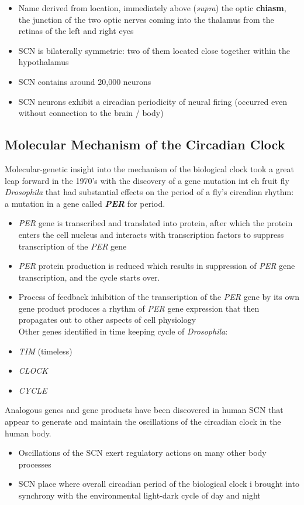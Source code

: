 \documentclass{article}
\begin{document}
\begin{itemize}
    \item Name derived from location, immediately above (\textit{supra}) the optic \textbf{chiasm}, the junction of the two optic nerves coming into the thalamus from the retinas of the left and right eyes
    \item SCN is bilaterally symmetric: two of them located close together within the hypothalamus
    \item SCN contains around 20,000 neurons
    \item SCN neurons exhibit a circadian periodicity of neural firing (occurred even without connection to the brain / body) 
\end{itemize}

\subsection{Molecular Mechanism of the Circadian Clock}
\noindent Molecular-genetic insight into the mechanism of the biological clock took a great leap forward in the 1970's with the discovery of a gene mutation int eh fruit fly  \textit{Drosophila} that had substantial effects on the period of a fly's circadian rhythm: a mutation in a gene called \textbf{\textit{PER}} for period. 
\begin{itemize}
    \item \textit{PER} gene is transcribed and translated into protein, after which the protein enters the cell nucleus and interacts with transcription factors to suppress transcription of the \textit{PER} gene
    \item \textit{PER} protein production is reduced which results in suppression of \textit{PER} gene transcription, and the cycle starts over. 
    \item Process of feedback inhibition of the transcription of the \textit{PER} gene by its own gene product produces a rhythm of \textit{PER} gene expression that then propagates out to other aspects of cell physiology \\
    
    Other genes identified in time keeping cycle of \textit{Drosophila}: 
    \item \textit{TIM} (timeless) 
    \item \textit{CLOCK}
    \item \textit{CYCLE}
\end{itemize}

Analogous genes and gene products have been discovered in human SCN that appear to generate and maintain the oscillations of the circadian clock in the human body. 
\begin{itemize}
    \item Oscillations of the SCN exert regulatory actions on many other body processes
    \item SCN place where overall circadian period of the biological clock i brought into synchrony with the environmental light-dark cycle of day and night
\end{itemize}
\end{document}
